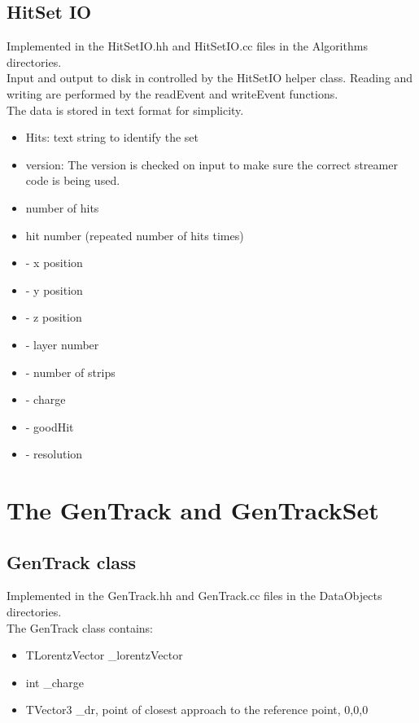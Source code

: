 \documentclass[aps,prd,superscriptaddress,floatfix]{revtex4}
\begin{document}
\subsection{HitSet IO}
Implemented in the HitSetIO.hh and HitSetIO.cc files in the Algorithms directories.
\\

Input and output to disk in controlled by the HitSetIO helper class.  Reading and writing
are performed by the readEvent and writeEvent functions.
\\

The data is stored in text format for simplicity.

\begin{itemize}
\item  Hits: text string to identify the set
\item version: The version is checked on input to make sure the correct streamer code is being used.
\item number of hits
\item hit number (repeated number of hits times)
\item - x position
\item - y position
\item - z position
\item - layer number
\item - number of strips
\item - charge
\item - goodHit
\item - resolution
\end{itemize}

\section{The GenTrack and GenTrackSet}
\subsection{GenTrack class}
Implemented in the GenTrack.hh and GenTrack.cc files in the DataObjects directories.
\\

The GenTrack class contains:
\begin{itemize}
\item TLorentzVector \_lorentzVector
\item int \_charge
\item TVector3 \_dr, point of closest approach to the reference point, 0,0,0
\end{itemize}
\end{document}

